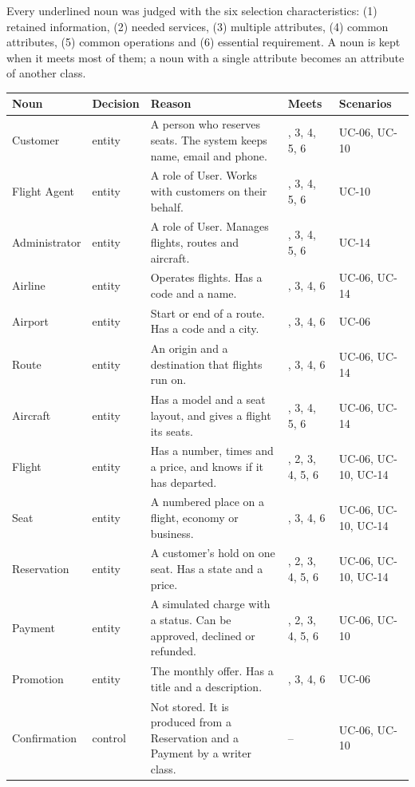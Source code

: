 Every underlined noun was judged with the six selection characteristics: (1)
retained information, (2) needed services, (3) multiple attributes, (4) common
attributes, (5) common operations and (6) essential requirement. A noun is kept
when it meets most of them; a noun with a single attribute becomes an attribute
of another class.

\begingroup
\small
\setlength{\tabcolsep}{4pt}
\begin{longtable}{@{}>{\raggedright\arraybackslash}p{2.3cm}>{\raggedright\arraybackslash}p{1.7cm}>{\raggedright\arraybackslash}p{5.4cm}>{\raggedright\arraybackslash}p{1.8cm}>{\raggedright\arraybackslash}p{2.4cm}@{}}
\toprule
\textbf{Noun} & \textbf{Decision} & \textbf{Reason} & \textbf{Meets} & \textbf{Scenarios}\\
\midrule
\endhead
Customer & entity & A person who reserves seats. The system keeps name, email and phone. & 1, 3, 4, 5, 6 & UC-06, UC-10\\
Flight Agent & entity & A role of User. Works with customers on their behalf. & 1, 3, 4, 5, 6 & UC-10\\
Administrator & entity & A role of User. Manages flights, routes and aircraft. & 1, 3, 4, 5, 6 & UC-14\\
Airline & entity & Operates flights. Has a code and a name. & 1, 3, 4, 6 & UC-06, UC-14\\
Airport & entity & Start or end of a route. Has a code and a city. & 1, 3, 4, 6 & UC-06\\
Route & entity & An origin and a destination that flights run on. & 1, 3, 4, 6 & UC-06, UC-14\\
Aircraft & entity & Has a model and a seat layout, and gives a flight its seats. & 1, 3, 4, 5, 6 & UC-06, UC-14\\
Flight & entity & Has a number, times and a price, and knows if it has departed. & 1, 2, 3, 4, 5, 6 & UC-06, UC-10, UC-14\\
Seat & entity & A numbered place on a flight, economy or business. & 1, 3, 4, 6 & UC-06, UC-10, UC-14\\
Reservation & entity & A customer's hold on one seat. Has a state and a price. & 1, 2, 3, 4, 5, 6 & UC-06, UC-10, UC-14\\
Payment & entity & A simulated charge with a status. Can be approved, declined or refunded. & 1, 2, 3, 4, 5, 6 & UC-06, UC-10\\
Promotion & entity & The monthly offer. Has a title and a description. & 1, 3, 4, 6 & UC-06\\
Confirmation & control & Not stored. It is produced from a Reservation and a Payment by a writer class. & -- & UC-06, UC-10\\
\bottomrule
\end{longtable}
\endgroup

